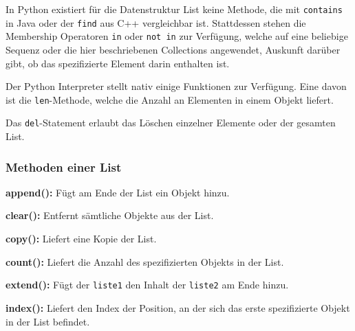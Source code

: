 In Python existiert für die Datenstruktur List keine Methode, die mit \lstinline$contains$ in Java oder der \lstinline$find$ aus C++ vergleichbar ist. Stattdessen stehen die Membership Operatoren \lstinline$in$ oder \lstinline$not in$ zur Verfügung, welche auf eine beliebige Sequenz oder die hier beschriebenen Collections angewendet, Auskunft darüber gibt, ob das spezifizierte Element darin enthalten ist.

\label{collections:lst:listinoperator}
    
Der Python Interpreter stellt nativ einige Funktionen zur Verfügung. Eine davon ist die \lstinline$len$-Methode, welche die Anzahl an Elementen in einem Objekt liefert.

\label{collections:lst:listlen}
    
Das \lstinline$del$-Statement erlaubt das Löschen einzelner Elemente oder der gesamten List.

\label{collections:lst:listdel}
    

\subsubsection{Methoden einer List}
\label{collections:list:methodes}

\textbf{append():}
Fügt am Ende der List ein Objekt hinzu.

\label{collections:lst:listappend}

\textbf{clear():}
Entfernt sämtliche Objekte aus der List.

\label{collections:lst:listclear}

\textbf{copy():}
Liefert eine Kopie der List.

\label{collections:lst:listcopy}
    
\textbf{count():}
Liefert die Anzahl des spezifizierten Objekts in der List.

\label{collections:lst:listcount}

\textbf{extend():} 
Fügt der \lstinline$liste1$ den Inhalt der \lstinline$liste2$ am Ende hinzu.

\label{collections:lst:listextend}
    
\textbf{index():}
Liefert den Index der Position, an der sich das erste spezifizierte Objekt in der List befindet.

\label{collections:lst:listindexmethode}
    
